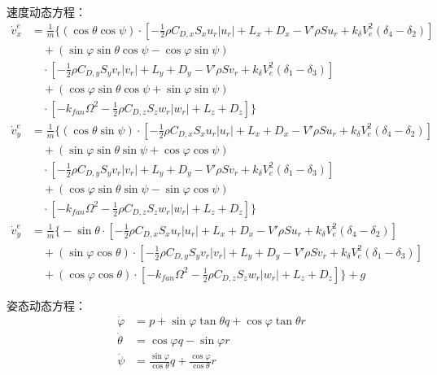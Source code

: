 速度动态方程：
\begin{equation}
    \begin{aligned}
        \dot{v}_{x}^{e} & =\frac{1}{m}\Bigg\{ (\cos{\theta}\cos{\psi}) 
        \cdot\left[-\frac{1}{2}\rho C_{D,x}S_xu_r|u_r|+L_x+D_x - V'\rho S u_r + k_\delta V_e^2(\delta_4 - \delta_2)\right] \\
        & \quad+ (\sin{\varphi}\sin{\theta}\cos{\psi}-\cos{\varphi}\sin{\psi}) \\
        & \quad\cdot\left[-\frac{1}{2}\rho C_{D,y}S_yv_r|v_r|+L_y+D_y - V'\rho S v_r + k_\delta V_e^2(\delta_1 - \delta_3)\right] \\
        & \quad+ (\cos{\varphi}\sin{\theta}\cos{\psi}+\sin{\varphi}\sin{\psi}) \\
        & \quad\cdot\left[-k_{fan}\Omega^2-\frac{1}{2}\rho C_{D,z}S_zw_r|w_r|+L_z+D_z\right]
        \Bigg\}
        \\
        \dot{v}_{y}^{e} & =\frac{1}{m}\Bigg\{ (\cos{\theta}\sin{\psi}) \cdot\left[-\frac{1}{2}\rho C_{D,x}S_xu_r|u_r|+L_x+D_x - V'\rho S u_r + k_\delta V_e^2(\delta_4 - \delta_2)\right] \\
        & \quad+ (\sin{\varphi}\sin{\theta}\sin{\psi}+\cos{\varphi}\cos{\psi}) \\
        & \quad\cdot\left[-\frac{1}{2}\rho C_{D,y}S_yv_r|v_r|+L_y+D_y - V'\rho S v_r + k_\delta V_e^2(\delta_1 - \delta_3)\right] \\
        & \quad+ (\cos{\varphi}\sin{\theta}\sin{\psi}-\sin{\varphi}\cos{\psi}) \\
        & \quad\cdot\left[-k_{fan}\Omega^2-\frac{1}{2}\rho C_{D,z}S_zw_r|w_r|+L_z+D_z\right]
        \Bigg\}
        \\
        \dot{v}_{y}^{e} & =\frac{1}{m}\Bigg\{ -\sin{\theta}\cdot\left[-\frac{1}{2}\rho C_{D,x}S_xu_r|u_r|+L_x+D_x - V'\rho S u_r + k_\delta V_e^2(\delta_4 - \delta_2)\right] \\
        & \quad+ (\sin{\varphi}\cos{\theta})\cdot\left[-\frac{1}{2}\rho C_{D,y}S_yv_r|v_r|+L_y+D_y - V'\rho S v_r + k_\delta V_e^2(\delta_1 - \delta_3)\right] \\
        & \quad+ (\cos{\varphi}\cos{\theta}) \cdot\left[-k_{fan}\Omega^2-\frac{1}{2}\rho C_{D,z}S_zw_r|w_r|+L_z+D_z\right]
        \Bigg\}+g
    \end{aligned}
    \label{eq_41}
\end{equation}

姿态动态方程：
\begin{equation}
    \begin{aligned}
        \dot{\varphi}&=p+\sin{\varphi}\tan{\theta}q+\cos{\varphi}\tan{\theta}r\\
        \dot{\theta}&=\cos{\varphi}q-\sin{\varphi}r\\
        \dot{\psi}&=\frac{\sin{\varphi}}{\cos{\theta}}q+\frac{\cos{\varphi}}{\cos{\theta}}r
    \end{aligned}
    \label{eq_42}
\end{equation}

